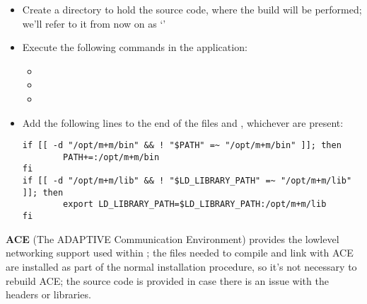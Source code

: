 \secondaryEnd
\tertiaryEnd
{}
\begin{itemize}
\item Create a directory to hold the source code, where the build will be performed; we'll
refer to it from now on as `'
\item\exSp{}Execute the following commands in the  application:
\begin{itemize}
\item {}
\item\exSp{}
\item\exSp{}
\end{itemize}
\item\exSp{}Add the following lines to the end of the files
 and ,
whichever are present:
\begin{verbatim}
if [[ -d "/opt/m+m/bin" && ! "$PATH" =~ "/opt/m+m/bin" ]]; then
        PATH+=:/opt/m+m/bin
fi
if [[ -d "/opt/m+m/lib" && ! "$LD_LIBRARY_PATH" =~ "/opt/m+m/lib" ]]; then
        export LD_LIBRARY_PATH=$LD_LIBRARY_PATH:/opt/m+m/lib
fi
\end{verbatim}
\end{itemize}
\tertiaryEnd
\secondaryEnd
{}
\textbf{ACE} (The ADAPTIVE Communication Environment) provides the low\longDash{}level
networking support used within \mplusm{}; the files needed to compile and link with ACE
are installed as part of the normal \mplusm{} installation procedure, so it's not
necessary to rebuild ACE; the source code is provided in case there is an issue with the
headers or libraries.\\

